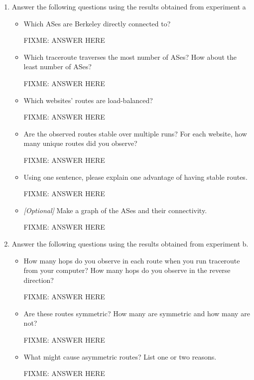 \documentclass[10pt]{article}
\begin{document}
\begin{enumerate}

\item Answer the following questions using the results obtained from experiment a

\begin{itemize}

\item Which ASes are Berkeley directly connected to?

FIXME: ANSWER HERE

\item Which traceroute traverses the most number of ASes? How about the least number of ASes?

FIXME: ANSWER HERE

\item Which websites' routes are load-balanced?

FIXME: ANSWER HERE

\item Are the observed routes stable over multiple runs? For each website, how many unique routes did you observe?

FIXME: ANSWER HERE

\item Using one sentence, please explain one advantage of having stable routes.

FIXME: ANSWER HERE

\item \emph{[Optional]} Make a graph of the ASes and their connectivity.

FIXME: ANSWER HERE

\end{itemize}

\item Answer the following questions using the results obtained from experiment b.

\begin{itemize}

\item How many hops do you observe in each route when you run traceroute from your computer? How many hops do you observe in the reverse direction?

FIXME: ANSWER HERE

\item Are these routes symmetric? How many are symmetric and how many are not?

FIXME: ANSWER HERE

\item What might cause asymmetric routes? List one or two reasons.

FIXME: ANSWER HERE

\end{itemize}
\end{enumerate}
\end{document}
